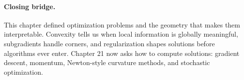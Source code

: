 \paragraph{Closing bridge.}
This chapter defined optimization problems and the geometry that makes them interpretable. Convexity tells us when local information is globally meaningful, subgradients handle corners, and regularization shapes solutions before algorithms ever enter. Chapter 21 now asks how to compute solutions: gradient descent, momentum, Newton-style curvature methods, and stochastic optimization.

\clearpage
